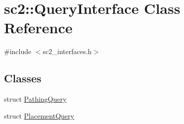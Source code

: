 \hypertarget{classsc2_1_1_query_interface}{}\section{sc2\+:\+:Query\+Interface Class Reference}
\label{classsc2_1_1_query_interface}


{\ttfamily \#include $<$sc2\+\_\+interfaces.\+h$>$}

\subsection*{Classes}
\begin{DoxyCompactItemize}
\item 
struct \hyperlink{structsc2_1_1_query_interface_1_1_pathing_query}{Pathing\+Query}
\item 
struct \hyperlink{structsc2_1_1_query_interface_1_1_placement_query}{Placement\+Query}
\end{DoxyCompactItemize}

